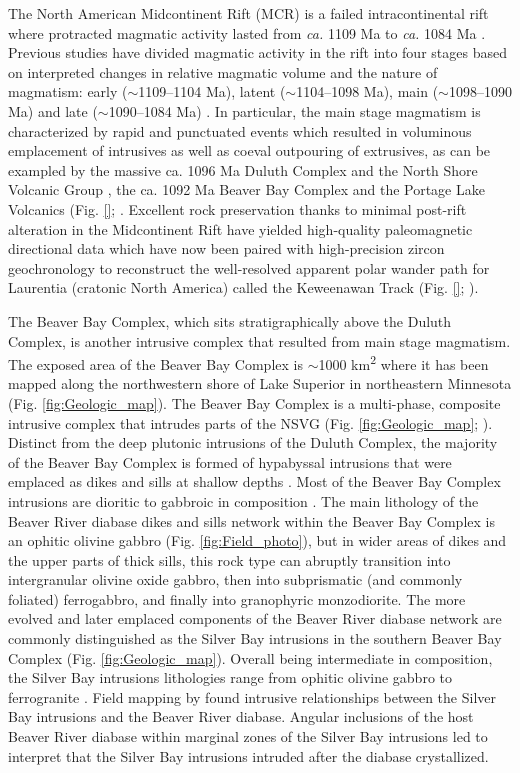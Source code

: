 \documentclass[draft]{agujournal2019}
\begin{document}
The North American Midcontinent Rift (MCR) is a failed intracontinental rift where protracted magmatic activity lasted from \textit{ca.} 1109 Ma to \textit{ca.} 1084 Ma \cite{Swanson-Hysell2019a}. Previous studies have divided magmatic activity in the rift into four stages based on interpreted changes in relative magmatic volume and the nature of magmatism: early ($\sim$1109–1104 Ma), latent ($\sim$1104–1098 Ma), main ($\sim$1098–1090 Ma) and late ($\sim$1090–1084 Ma) \cite{Vervoort2007a, Heaman2007a, Miller2013a}. In particular, the main stage magmatism is characterized by rapid and punctuated events which resulted in voluminous emplacement of intrusives as well as coeval outpouring of extrusives, as can be exampled by the massive ca. 1096 Ma Duluth Complex and the North Shore Volcanic Group \cite{Swanson-Hysell2020a}, the ca. 1092 Ma Beaver Bay Complex and the Portage Lake Volcanics (Fig. \ref{}; . Excellent rock preservation thanks to minimal post-rift alteration in the Midcontinent Rift have yielded high-quality paleomagnetic directional data which have now been paired with high-precision zircon geochronology to reconstruct the well-resolved apparent polar wander path for Laurentia (cratonic North America) called the Keweenawan Track (Fig. \ref{}; ). 



The Beaver Bay Complex, which sits stratigraphically above the Duluth Complex, is another intrusive complex that resulted from main stage magmatism. The exposed area of the Beaver Bay Complex is $\sim$1000 km\textsuperscript{2} where it has been mapped along the northwestern shore of Lake Superior in northeastern Minnesota (Fig. \ref{fig:Geologic_map}). The Beaver Bay Complex is a multi-phase, composite intrusive complex that intrudes parts of the NSVG (Fig. \ref{fig:Geologic_map}; ). Distinct from the deep plutonic intrusions of the Duluth Complex, the majority of the Beaver Bay Complex is formed of hypabyssal intrusions that were emplaced as dikes and sills at shallow depths \cite{Miller1997a}. Most of the Beaver Bay Complex intrusions are dioritic to gabbroic in composition \cite{Miller1997a}. The main lithology of the Beaver River diabase dikes and sills network within the Beaver Bay Complex is an ophitic olivine gabbro (Fig. \ref{fig:Field_photo}), but in wider areas of dikes and the upper parts of thick sills, this rock type can abruptly transition into intergranular olivine oxide gabbro, then into subprismatic (and commonly foliated) ferrogabbro, and finally into granophyric monzodiorite. The more evolved and later emplaced components of the Beaver River diabase network are commonly distinguished as the Silver Bay intrusions in the southern Beaver Bay Complex (Fig. \ref{fig:Geologic_map}). Overall being intermediate in composition, the Silver Bay intrusions lithologies range from ophitic olivine gabbro to ferrogranite \cite{Shank1989a}. Field mapping by  found intrusive relationships between the Silver Bay intrusions and the Beaver River diabase. Angular inclusions of the host Beaver River diabase within marginal zones of the Silver Bay intrusions led  to interpret that the Silver Bay intrusions intruded after the diabase crystallized.
\end{document}
